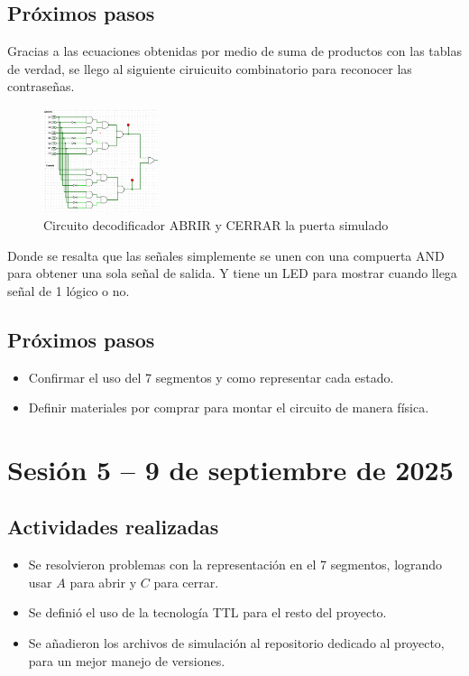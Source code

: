 \documentclass[12pt,letterpaper]{article}
\begin{document}
\subsection*{Próximos pasos}
Gracias a las ecuaciones obtenidas por medio de suma de productos con las tablas de verdad, se llego al siguiente ciruicuito combinatorio para reconocer las contraseñas.
\begin{figure}[H]
    \centering
    \includegraphics[width=0.3\textwidth]{images/sim_decodifcador.png} %
    \caption{Circuito decodificador ABRIR y CERRAR la puerta simulado}
    \label{fig:sensores}
\end{figure}
Donde se resalta que las señales simplemente se unen con una compuerta AND para obtener una sola señal de salida. Y tiene un LED para mostrar cuando llega señal de 1 lógico o no.

\subsection*{Próximos pasos}
\begin{itemize}
    \item Confirmar el uso del 7 segmentos y como representar cada estado.
    \item Definir materiales por comprar para montar el circuito de manera física.
\end{itemize}

\section{Sesión 5 -- 9 de septiembre de 2025}
\subsection*{Actividades realizadas}
\begin{itemize}
    \item Se resolvieron problemas con la representación en el 7 segmentos, logrando usar $A$ para abrir y $C$ para cerrar.
    \item Se definió el uso de la tecnología TTL para el resto del proyecto.
    \item Se añadieron los archivos de simulación al repositorio dedicado al proyecto, para un mejor manejo de versiones.
\end{itemize}
\end{document}
